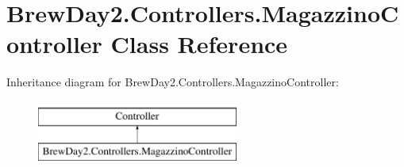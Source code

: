 \hypertarget{class_brew_day2_1_1_controllers_1_1_magazzino_controller}{}\section{Brew\+Day2.\+Controllers.\+Magazzino\+Controller Class Reference}
\label{class_brew_day2_1_1_controllers_1_1_magazzino_controller}
Inheritance diagram for Brew\+Day2.\+Controllers.\+Magazzino\+Controller\+:\begin{figure}[H]
\begin{center}
\leavevmode
\includegraphics[height=2.000000cm]{class_brew_day2_1_1_controllers_1_1_magazzino_controller}
\end{center}
\end{figure}
